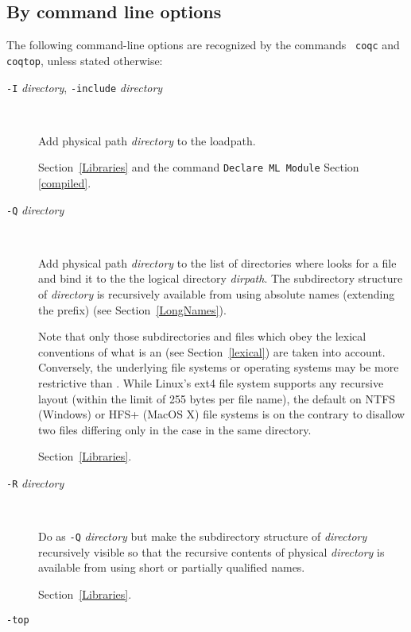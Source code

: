 \subsection{By command line options
\label{coqoptions}}

The following command-line options are recognized by the commands {\tt
  coqc} and {\tt coqtop}, unless stated otherwise:

\begin{description}
\item[{\tt -I} {\em directory}, {\tt -include} {\em directory}]\ %

  Add physical path {\em directory} to the {\ocaml} loadpath.

  \SeeAlso Section~\ref{Libraries} and the command {\tt Declare ML Module} Section \ref{compiled}.

\item[{\tt -Q} {\em directory} {\dirpath}]\ %

  Add physical path \emph{directory} to the list of directories where
  {\Coq} looks for a file and bind it to the the logical directory
  \emph{dirpath}. The subdirectory structure of \emph{directory} is
  recursively available from {\Coq} using absolute names (extending
  the {\dirpath} prefix) (see Section~\ref{LongNames}).

  Note that only those subdirectories and files which obey the lexical
  conventions of what is an {\ident} (see Section~\ref{lexical})
  are taken into account. Conversely, the underlying file systems or
  operating systems may be more restrictive than {\Coq}. While Linux's
  ext4 file system supports any {\Coq} recursive layout
  (within the limit of 255 bytes per file name), the default on NTFS
  (Windows) or HFS+ (MacOS X) file systems is on the contrary to
  disallow two files differing only in the case in the same directory.

  \SeeAlso Section~\ref{Libraries}.

\item[{\tt -R} {\em directory} {\dirpath}]\ %

  Do as \texttt{-Q} \emph{directory} {\dirpath} but make the
  subdirectory structure of \emph{directory} recursively visible so
  that the recursive contents of physical \emph{directory} is available
  from {\Coq} using short or partially qualified names.

  \SeeAlso Section~\ref{Libraries}.

\item[{\tt -top} {\dirpath}]\ %


\end{description}
